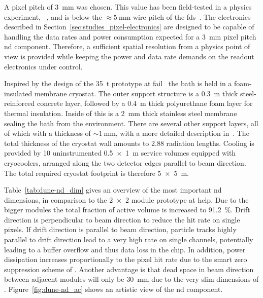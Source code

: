 A pixel pitch of \SI{3}{\milli\metre} was chosen.
This value has been field-tested in a physics experiment, \uboone{}~\cite{uboone}, and is below the $\approx \SI{5}{\milli\metre}$ wire pitch of the \dune{} \glspl{fd}~\cite{dune4}.
The \larpix{} electronics described in Section~\ref{sec:studies_pixel-electronics} are designed to be capable of handling the data rates and power consumption expected for a \SI{3}{\milli\metre} pixel pitch \AC{} \gls{nd} component.
Therefore, a sufficient spatial resolution from a physics point of view is provided while keeping the power and data rate demands on the readout electronics under control.

Inspired by the design of the \dune{} \SI{35}{\tonne} prototype at \gls{fail}~\cite{dune4} the \lar{} bath is held in a foam-insulated membrane cryostat.
The outer support structure is a \SI{0.3}{\metre} thick steel-reinforced concrete layer, followed by a \SI{0.4}{\metre} thick polyurethane foam layer for thermal insulation.
Inside of this is a \SI{2}{\milli\metre} thick stainless steel membrane sealing the \lar{} bath from the environment.
There are several other support layers, all of which with a thickness of $\sim{\SI{1}{\milli\metre}}$, with a more detailed description in~\cite{dune4}.
The total thickness of the cryostat wall amounts to \num{2.88} radiation lengths.
Cooling is provided by \num{10} uninstrumented \SI{0.5 x 1}{\metre} service volumes equipped with cryocoolers, arranged along the two detector edges parallel to beam direction.
The total required cryostat footprint is therefore \SI{5 x 5}{\metre}.

Table~\ref{tab:dune-nd_dim} gives an overview of the most important \AC{} \gls{nd} dimensions, in comparison to the \num{2 x 2} module prototype at \gls{help}.
Due to the bigger modules the total fraction of active volume is increased to \SI{91.2}{\percent}.
Drift direction is perpendicular to beam direction to reduce the hit rate on single pixels.
If drift direction is parallel to beam direction, particle tracks highly parallel to drift direction lead to a very high rate on single channels, potentially leading to a buffer overflow and thus data loss in the \larpix{} chip.
In addition, power dissipation increases proportionally to the pixel hit rate due to the smart zero suppression scheme of \larpix{}.
Another advantage is that dead space in beam direction between adjacent modules will only be \SI{30}{\milli\metre} due to the very slim dimensions of \AL{}.
Figure~\ref{fig:dune-nd_ac} shows an artistic view of the \AC{} \gls{nd} component.